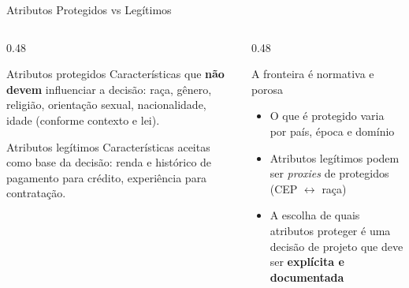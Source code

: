 \documentclass[aspectratio=169,xcolor=dvipsnames]{beamer}
\begin{document}
  \begin{frame}{Atributos Protegidos vs Legítimos}
    \begin{columns}[T]
      \begin{column}{0.48\textwidth}
        \begin{block}{Atributos protegidos}
          Características que \textbf{não devem} influenciar a decisão: raça, gênero, religião, orientação sexual, nacionalidade, idade (conforme contexto e lei).
        \end{block}
        \begin{block}{Atributos legítimos}
          Características aceitas como base da decisão: renda e histórico de pagamento para crédito, experiência para contratação.
        \end{block}
      \end{column}
      \begin{column}{0.48\textwidth}
        \begin{alertblock}{A fronteira é normativa e porosa}
          \begin{itemize}\setlength{\itemsep}{0.2em}
            \item O que é protegido varia por país, época e domínio
            \item Atributos legítimos podem ser \textit{proxies} de protegidos (CEP $\leftrightarrow$ raça)
            \item A escolha de quais atributos proteger é uma decisão de projeto que deve ser \textbf{explícita e documentada}
          \end{itemize}
        \end{alertblock}
      \end{column}
    \end{columns}
  \end{frame}
\end{document}
